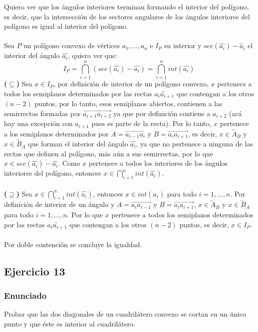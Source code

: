 \documentclass[a4paper]{article}
\begin{document}
Quiero ver que los ángulos interiores terminan formando el interior del polígono, es decir, que la intersección de los sectores angulares de los ángulos interiores del polígono es igual al interior del polígono.\\\\
Sea $P$ un polígono convexo de vértices $a_1,\dots,a_n$ e $I_P$ su interior y $sec(\hat{a_i}) -\hat{a}_i$ el interior del ángulo $\hat{a_i}$, quiero ver que:
\begin{equation}
    I_P = \bigcap_{i=1}^{n} (sec(\hat{a_i}) -\hat{a_i}) = \bigcap_{i=1}^{n} int(\hat{a_i})
\end{equation}
\textbf{($\subseteq$)} Sea $x \in I_P$, por definición de interior de un polígono convexo, $x$ pertenece a todos los semiplanos determinados por las rectas $\overleftrightarrow{a_ia_{i+1}}$ que contengan a los otros $(n-2)$ puntos, por lo tanto, esos semiplanos abiertos, contienen a las semirrectas formadas por $\overrightarrow{a_{i+1}a_{i+2}}$ ya que por definición contiene a $a_{i+2}$ (acá hay una excepción con $a_{i+1}$ pues es parte de la recta). Por lo tanto, $x$ pertenece a los semiplanos determinados por $A=\overrightarrow{a_{i-1}a_i}$ y $B=\overrightarrow{a_ia_{i+1}}$, es decir, $x \in \overleftrightarrow{A}_B$ y $x \in \overleftrightarrow{B}_A$ que forman el interior del ángulo $\hat{a_i}$, ya que no pertenece a ninguna de las rectas que definen al polígono, más aún a sus semirrectas, por lo que $x \in sec(\hat{a_i})-\hat{a_i}$. Como $x$ pertenece a todos los interiores de los ángulos interiores del polígono, entonces $x \in \bigcap_{i=1}^{n} int(\hat{a_i})$.\\\\
\textbf{($\supseteq$)} Sea $x \in \bigcap_{i=1}^{n} int(\hat{a_i})$, entonces $x \in int(\hat{a_i})$ para todo $i=1,\dots,n$. Por definición de interior de un ángulo y $A=\overrightarrow{a_ia_{i-1}}$ y $B=\overrightarrow{a_{i}a_{i+1}}$, $x \in \overleftrightarrow{A}_B$ y $x \in \overleftrightarrow{B}_A$ para todo $i=1,\dots,n$. Por lo que $x$ pertenece a todos los semiplanos determinados por las rectas $\overleftrightarrow{a_ia_{i+1}}$ que contengan a los otros $(n-2)$ puntos, es decir, $x \in I_P$.\\\\

Por doble contención se concluye la igualdad.
\subsection{Ejercicio 13}
\subsubsection{Enunciado}
Probar que las dos diagonales de un cuadrilátero convexo se cortan en un único punto y que éste es interior al cuadrilátero.
\end{document}
